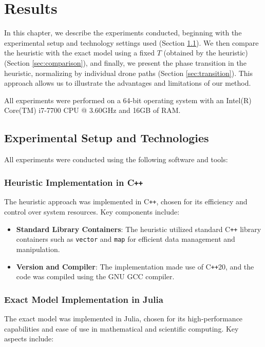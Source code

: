 \chapter{Results}
\label{Results}

In this chapter, we describe the experiments conducted, beginning with the experimental setup and technology settings used (Section \ref{sec:setup}). We then compare the heuristic with the exact model using a fixed $T$ (obtained by the heuristic) (Section \ref{sec:comparison}), and finally, we present the phase transition in the heuristic, normalizing by individual drone paths (Section \ref{sec:transition}). This approach allows us to illustrate the advantages and limitations of our method.

All experiments were performed on a 64-bit operating system with an Intel(R) Core(TM) i7-7700 CPU @ 3.60GHz and 16GB of RAM.

\section{Experimental Setup and Technologies}
\label{sec:setup}

All experiments were conducted using the following software and tools:

\subsection{Heuristic Implementation in C\texttt{++}}

The heuristic approach was implemented in C\texttt{++}, chosen for its efficiency and control over system resources. Key components include:

\begin{itemize}
\item \textbf{Standard Library Containers}: The heuristic utilized standard C\texttt{++} library containers such as \texttt{vector} and \texttt{map} for efficient data management and manipulation. 
\item \textbf{Version and Compiler}: The implementation made use of C\texttt{++}20, and the code was compiled using the GNU GCC compiler.
\end{itemize}

\subsection{Exact Model Implementation in Julia}

The exact model was implemented in Julia, chosen for its high-performance capabilities and ease of use in mathematical and scientific computing. Key aspects include:

